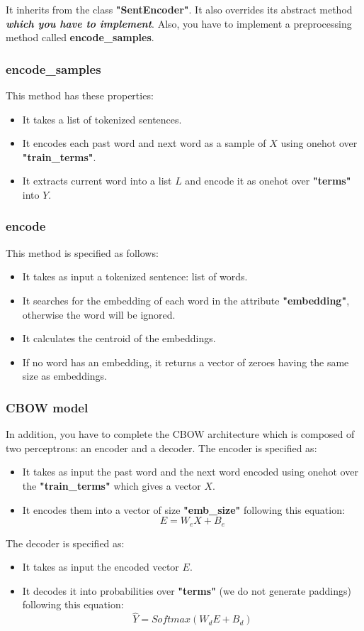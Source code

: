\documentclass[11pt, a4paper]{article}
\begin{document}
It inherits from the class \textbf{"SentEncoder"}. 
It also overrides its abstract method \textbf{\textit{\color{red}which you have to implement}}.
Also, you have to implement a preprocessing method called \textbf{encode\_samples}.

\subsubsection{encode\_samples}

This method has these properties:
\begin{itemize}
	\item It takes a list of tokenized sentences.
	\item It encodes each past word and next word as a sample of $X$ using onehot over \textbf{"train\_terms"}.
	\item It extracts current word into a list $L$ and encode it as onehot over \textbf{"terms"} into $Y$.
\end{itemize} 

\subsubsection{encode}

This method is specified as follows:
\begin{itemize}
	\item It takes as input a tokenized sentence: list of words.
	\item It searches for the embedding of each word in the attribute \textbf{"embedding"}, otherwise the word will be ignored.
	\item It calculates the centroid of the embeddings.
	\item If no word has an embedding, it returns a vector of zeroes having the same size as embeddings.
\end{itemize}


\subsubsection{CBOW model}

In addition, you have to complete the CBOW architecture which is composed of two perceptrons: an encoder and a decoder.
The encoder is specified as:
\begin{itemize}
	\item It takes as input the past word and the next word encoded using onehot over the \textbf{"train\_terms"} which gives a vector $X$.
	\item It encodes them into a vector of size \textbf{"emb\_size"} following this equation:
	\[E = W_e X + B_e\]
\end{itemize}
The decoder is specified as:
\begin{itemize}
	\item It takes as input the encoded vector $E$.
	\item It decodes it into probabilities over \textbf{"terms"} (we do not generate paddings) following this equation:
	\[\hat{Y} = Softmax(W_d E + B_d)\]
\end{itemize}
\end{document}
